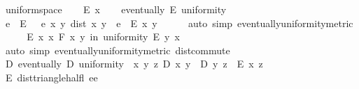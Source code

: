 \begin{isabellebody}
\isamarkupfalse%
\ uniform{\isacharunderscore}{\kern0pt}space\isanewline
%
\isadelimproof
%
\endisadelimproof
%
\isatagproof
{}\isamarkupfalse%
\isanewline
\ \ \isamarkupfalse%
\ E\ x\isanewline
\ \ \isamarkupfalse%
\ {\isachardoublequoteopen}eventually\ E\ uniformity{\isachardoublequoteclose}\isanewline
\ \ \isamarkupfalse%
\ \isamarkupfalse%
\ e\ \ E{\isacharcolon}{\kern0pt}\ {\isachardoublequoteopen}{}\ {\isacharless}{\kern0pt}\ e{\isachardoublequoteclose}\ {\isachardoublequoteopen}{\isasymAnd}x\ y{\isachardot}{\kern0pt}\ dist\ x\ y\ {\isacharless}{\kern0pt}\ e\ {\isasymLongrightarrow}\ E\ {\isacharparenleft}{\kern0pt}x{\isacharcomma}{\kern0pt}\ y{\isacharparenright}{\kern0pt}{\isachardoublequoteclose}\isanewline
\ \ \ \ \isamarkupfalse%
\ {\isacharparenleft}{\kern0pt}auto\ simp{\isacharcolon}{\kern0pt}\ eventually{\isacharunderscore}{\kern0pt}uniformity{\isacharunderscore}{\kern0pt}metric{\isacharparenright}{\kern0pt}\isanewline
\ \ \isamarkupfalse%
\ \isamarkupfalse%
\ {\isachardoublequoteopen}E\ {\isacharparenleft}{\kern0pt}x{\isacharcomma}{\kern0pt}\ x{\isacharparenright}{\kern0pt}{\isachardoublequoteclose}\ {\isachardoublequoteopen}{\isasymforall}\isactrlsub F\ {\isacharparenleft}{\kern0pt}x{\isacharcomma}{\kern0pt}\ y{\isacharparenright}{\kern0pt}\ in\ uniformity{\isachardot}{\kern0pt}\ E\ {\isacharparenleft}{\kern0pt}y{\isacharcomma}{\kern0pt}\ x{\isacharparenright}{\kern0pt}{\isachardoublequoteclose}\isanewline
\ \ \ \ \isamarkupfalse%
\ {\isacharparenleft}{\kern0pt}auto\ simp{\isacharcolon}{\kern0pt}\ eventually{\isacharunderscore}{\kern0pt}uniformity{\isacharunderscore}{\kern0pt}metric\ dist{\isacharunderscore}{\kern0pt}commute{\isacharparenright}{\kern0pt}\isanewline
\ \ \isamarkupfalse%
\ {\isachardoublequoteopen}{\isasymexists}D{\isachardot}{\kern0pt}\ eventually\ D\ uniformity\ {\isasymand}\ {\isacharparenleft}{\kern0pt}{\isasymforall}x\ y\ z{\isachardot}{\kern0pt}\ D\ {\isacharparenleft}{\kern0pt}x{\isacharcomma}{\kern0pt}\ y{\isacharparenright}{\kern0pt}\ {\isasymlongrightarrow}\ D\ {\isacharparenleft}{\kern0pt}y{\isacharcomma}{\kern0pt}\ z{\isacharparenright}{\kern0pt}\ {\isasymlongrightarrow}\ E\ {\isacharparenleft}{\kern0pt}x{\isacharcomma}{\kern0pt}\ z{\isacharparenright}{\kern0pt}{\isacharparenright}{\kern0pt}{\isachardoublequoteclose}\isanewline
\ \ \ \ \isamarkupfalse%
\ E\ dist{\isacharunderscore}{\kern0pt}triangle{\isacharunderscore}{\kern0pt}half{\isacharunderscore}{\kern0pt}l{\isacharbrackleft}{\kern0pt}\ e{\isacharequal}{\kern0pt}e{\isacharbrackright}{\kern0pt}\isanewline

\end{isabellebody}
